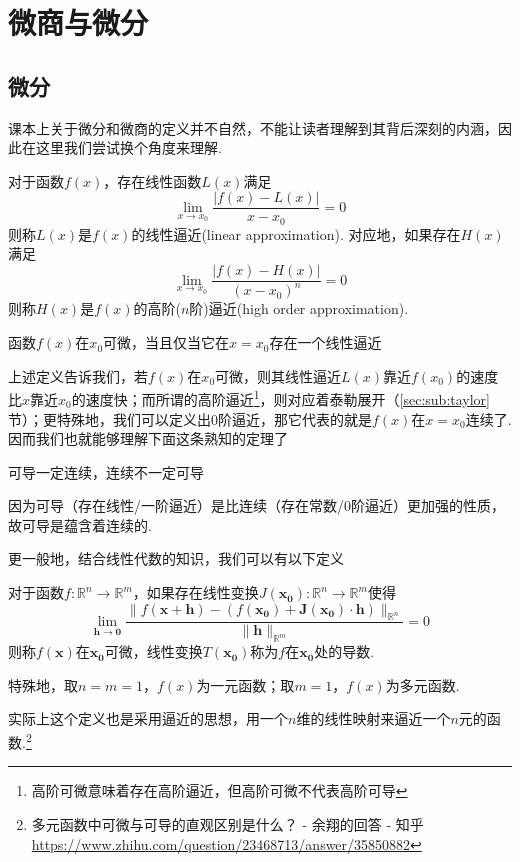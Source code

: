 
\section{微商与微分}
\subsection{微分}
课本上关于微分和微商的定义并不自然，不能让读者理解到其背后深刻的内涵，因此在这里我们尝试换个角度来理解.
\begin{definition}
对于函数$f(x)$，存在线性函数$L(x)$满足
\[\lim_{x\to x_0}\frac{|f(x)-L(x)|}{x-x_0}=0\]
则称$L(x)$是$f(x)$的线性逼近(linear approximation).
对应地，如果存在$H(x)$满足
\[\lim_{x\to x_0}\frac{|f(x)-H(x)|}{(x-x_0)^n}=0\]
则称$H(x)$是$f(x)$的高阶($n$阶)逼近(high order approximation).
\end{definition}
\begin{definition}[可微性]
\label{differentiability}
函数$f(x)$在$x_0$可微，当且仅当它在$x=x_0$存在一个线性逼近
\end{definition}
上述定义告诉我们，若$f(x)$在$x_0$可微，则其线性逼近$L(x)$靠近$f(x_0)$的速度比$x$靠近$x_0$的速度快；而所谓的高阶逼近\footnote{高阶可微意味着存在高阶逼近，但高阶可微不代表高阶可导}，则对应着泰勒展开（\ref{sec:sub:taylor}节）；更特殊地，我们可以定义出$0$阶逼近，那它代表的就是$f(x)$在$x=x_0$连续了. 因而我们也就能够理解下面这条熟知的定理了
\begin{theorem}
可导一定连续，连续不一定可导
\end{theorem}
因为可导（存在线性/一阶逼近）是比连续（存在常数/$0$阶逼近）更加强的性质，故可导是蕴含着连续的.
\par 更一般地，结合线性代数的知识，我们可以有以下定义
\begin{definition}
\label{def:multi_derivative_intro}
对于函数$f:\mathbb{R}^n\to\mathbb{R}^m$，如果存在线性变换$J(\mathbf{x_0}):\mathbb{R}^n\to\mathbb{R}^m$使得
\[\lim_{\mathbf{h}\to \mathbf{0}}\frac{\|f(\mathbf{x}+\mathbf{h})-(f(\mathbf{x_0})+\mathbf{J}(\mathbf{x_0})\cdot \mathbf{h})\|_{\mathbb{R}^n}}{\|\mathbf{h}\|_{\mathbb{R}^m}}=0\]
则称$f(\mathbf{x})$在$\mathbf{x_0}$可微，线性变换$T(\mathbf{x_0})$称为$f$在$\mathbf{x_0}$处的导数.
\par 特殊地，取$n=m=1$，$f(x)$为一元函数；取$m=1$，$f(x)$为多元函数.
\end{definition}
实际上这个定义也是采用逼近的思想，用一个$n$维的线性映射来逼近一个$n$元的函数.\footnote{多元函数中可微与可导的直观区别是什么？ - 余翔的回答 - 知乎 \url{https://www.zhihu.com/question/23468713/answer/35850882}}
